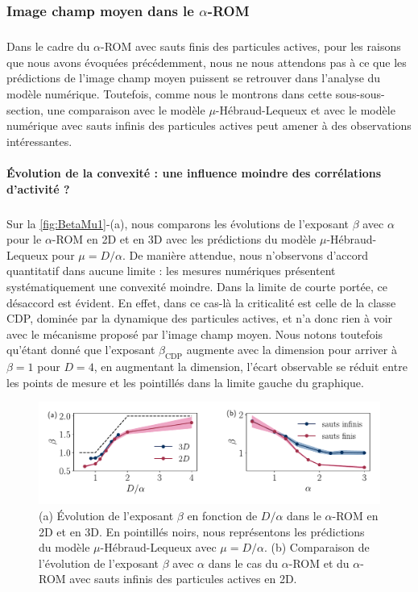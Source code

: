 \subsubsection{Image champ moyen dans le $\alpha$-ROM}

\subparagraph{}Dans le cadre du $\alpha$-ROM avec sauts finis des particules actives, pour les raisons que nous avons évoquées précédemment, nous ne nous attendons pas à ce que les prédictions de l'image champ moyen puissent se retrouver dans l'analyse du modèle numérique. Toutefois, comme nous le montrons dans cette sous-sous-section, une comparaison avec le modèle $\mu$-Hébraud-Lequeux et avec le modèle numérique avec sauts infinis des particules actives peut amener à des observations intéressantes.

\paragraph{Évolution de la convexité : une influence moindre des corrélations d'activité ?}

\subparagraph{}Sur la \autoref{fig:BetaMu1}-(a), nous comparons les évolutions de l'exposant $\beta$ avec $\alpha$ pour le $\alpha$-ROM en 2D et en 3D avec les prédictions du modèle $\mu$-Hébraud-Lequeux pour $\mu = D/\alpha$. De manière attendue, nous n'observons d'accord quantitatif dans aucune limite : les mesures numériques présentent systématiquement une convexité moindre. Dans la limite de courte portée, ce désaccord est évident. En effet, dans ce cas-là la criticalité est celle de la classe CDP, dominée par la dynamique des particules actives, et n'a donc rien à voir avec le mécanisme proposé par l'image champ moyen. Nous notons toutefois qu'étant donné que l'exposant $\beta_\text{CDP}$ augmente avec la dimension pour arriver à $\beta = 1$ pour $D=4$, en augmentant la dimension, l'écart observable se réduit entre les points de mesure et les pointillés dans la limite gauche du graphique.

\begin{figure}[h]
	\centering
	\includegraphics[width = \textwidth]{Chapitre3/Figures/Interpretation/Beta_Mu1.pdf}
	\caption{(a) Évolution de l'exposant $\beta$ en fonction de $D/\alpha$ dans le $\alpha$-ROM en 2D et en 3D. En pointillés noirs, nous représentons les prédictions du modèle $\mu$-Hébraud-Lequeux avec $\mu = D/\alpha$. (b) Comparaison de l'évolution de l'exposant $\beta$ avec $\alpha$ dans le cas du $\alpha$-ROM et du $\alpha$-ROM avec sauts infinis des particules actives en 2D.}
	\label{fig:BetaMu1}
\end{figure}

